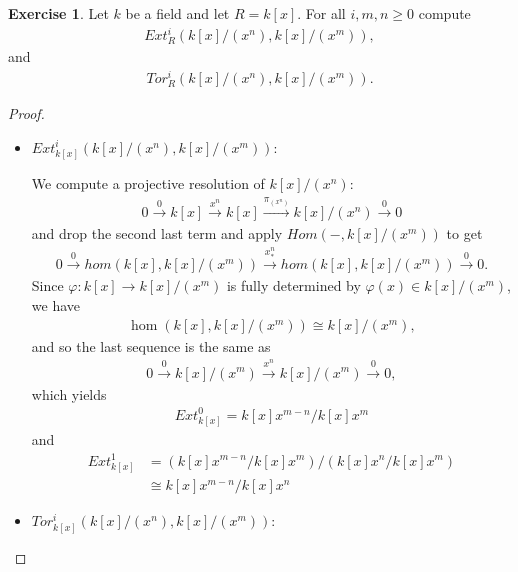\documentclass[12pt]{extarticle}
\newcommand{\<}{\langle}
\renewcommand{\>}{\rangle}
\theoremstyle{definition}
\newtheorem{exercise}{Exercise}
\begin{document}
\begin{exercise}
  Let $k$ be a field and let $R = k[x]$. For all $i,m,n \geq 0$ compute
  \begin{align*}
    Ext_R^i(k[x]/(x^n), k[x]/(x^m)),
  \end{align*}
  and
  \begin{align*}
    Tor_R^i(k[x]/(x^n), k[x]/(x^m)).
  \end{align*}
\end{exercise}


\begin{proof}
  \begin{itemize}
  \item
    $Ext_{k[x]}^i(k[x]/(x^n), k[x]/(x^m))$:
    
    We compute a projective resolution of $k[x]/(x^n)$:
    \begin{align*}
      0 \xrightarrow{0} k[x] \xrightarrow{x^n} k[x] \xrightarrow{\pi_{(x^n)}} k[x]/(x^n) \xrightarrow{0} 0  
    \end{align*}
    and drop the second last term and apply $Hom(-, k[x]/(x^m))$ to get
    \begin{align*}
      0 \xrightarrow{0} hom(k[x],k[x]/(x^m)) \xrightarrow{x^n_*} hom(k[x], k[x]/(x^m)) \xrightarrow{0} 0.
    \end{align*}
    Since $\varphi: k[x] \to k[x]/(x^m)$ is fully determined by $\varphi(x) \in k[x]/(x^m)$, we have 
    \begin{align*}
      \hom(k[x],k[x]/(x^m)) \cong k[x]/(x^m),
    \end{align*}
    and so the last sequence is the same as
    \begin{align*}
      0 \xrightarrow{0} k[x]/(x^m) \xrightarrow{x^n} k[x]/(x^m) \xrightarrow{0} 0,
    \end{align*}
    which yields
    \begin{align*}
      Ext_{k[x]}^0 = k[x]x^{m-n}/k[x]x^m
    \end{align*}
    and
    \begin{align*}
      Ext_{k[x]}^1 &= (k[x]x^{m-n}/k[x]x^m)/(k[x]x^n/k[x]x^m) \\
      &\cong k[x]x^{m-n}/k[x]x^n
    \end{align*}
  \item
    $Tor_{k[x]}^i(k[x]/(x^n), k[x]/(x^m)):$


\end{itemize}
\end{proof}
\end{document}
